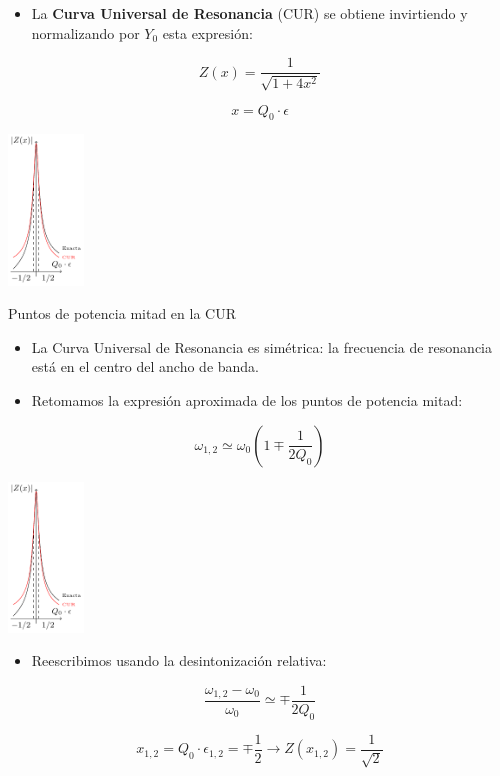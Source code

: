 \begin{itemize}
\item La \textbf{Curva Universal de Resonancia} (CUR) se obtiene invirtiendo y normalizando por \(Y_0\) esta expresión:
\end{itemize}
\[
  \boxed{Z(x) = \frac{1}{\sqrt{1 + 4 x^2}}}
\]

\[
x = Q_0 \cdot \epsilon
\]


\begin{center}
\includegraphics[height=4cm]{../figs/CUR.pdf}
\end{center}


{Puntos de potencia mitad en la CUR}



\begin{itemize}
\item La Curva Universal de Resonancia es simétrica: la frecuencia de resonancia está en el centro del ancho de banda.
\item Retomamos la expresión aproximada de los puntos de potencia mitad:
\end{itemize}
\[
  \omega_{1,2} \simeq \omega_0 (1 \mp \frac{1}{2Q_0})
\]


\begin{center}
\includegraphics[height=4cm]{../figs/CUR.pdf}
\end{center}


\begin{itemize}
\item Reescribimos usando la desintonización relativa:
\end{itemize}
\[
  \frac{\omega_{1,2} - \omega_0}{\omega_0} \simeq \mp \frac{1}{2Q_0}
\]

\[
  \boxed{x_{1,2} = Q_0 \cdot \epsilon_{1,2} = \mp \frac{1}{2}} \rightarrow Z(x_{1,2}) = \frac{1}{\sqrt{2}}
\]



